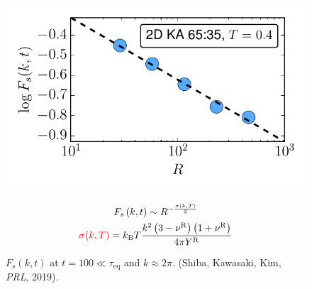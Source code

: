 \begin{frame}[c]
\begin{columns}[T]
\begin{column}[T]{0.5\linewidth}
\begin{figure}
\includegraphics[height=0.5\textheight]{c.10-kt_merminwagner_1/merminwagner_comparison_1.pdf}
\caption{$F_s(k,t)$ at $t=100 \ll \tau_\mathrm{eq}$ and $k\approx 2\pi$. (Shiba, Kawasaki, Kim, \textit{PRL}, 2019). }
\vspace{-20pt}
    \begin{gather*}
    F_{s}\left(k,t \right)  \sim R^{-\frac{\sigma(k, T)}{2}} \\
    {\color{red}\sigma(k, T)} = k_{\mathrm{B}} T \frac{k^{2}\left(3-\nu^{\mathrm{R}}\right)\left(1+\nu^{\mathrm{R}}\right)}{4 \pi Y^{\mathrm{R}}}
    \end{gather*}
\end{figure}

\end{column}

\end{columns}

\end{frame}







